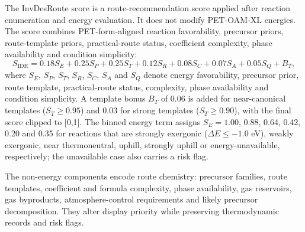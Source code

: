\documentclass[11pt, letterpaper]{article}
\newcommand{\invdesroute}{InvDesRoute}
\begin{document}
The \invdesroute{} score is a route-recommendation score applied after reaction enumeration and energy evaluation. It does not modify PET-OAM-XL energies. The score combines PET-form-aligned reaction favorability, precursor priors, route-template priors, practical-route status, coefficient complexity, phase availability and condition simplicity:
\begin{equation}
S_{\mathrm{IDR}}
=0.18S_E
+0.25S_P
+0.25S_T
+0.12S_R
+0.08S_C
+0.07S_A
+0.05S_Q
+B_T ,
\end{equation}
where $S_E$, $S_P$, $S_T$, $S_R$, $S_C$, $S_A$ and $S_Q$ denote energy favorability, precursor prior, route template, practical-route status, complexity, phase availability and condition simplicity. A template bonus $B_T$ of 0.06 is added for near-canonical templates ($S_T\geq0.95$) and 0.03 for strong templates ($S_T\geq0.90$), with the final score clipped to [0,1]. The binned energy term assigns $S_E=1.00$, 0.88, 0.64, 0.42, 0.20 and 0.35 for reactions that are strongly exergonic ($\Delta E\leq-1.0$ eV), weakly exergonic, near thermoneutral, uphill, strongly uphill or energy-unavailable, respectively; the unavailable case also carries a risk flag.

The non-energy components encode route chemistry: precursor families, route templates, coefficient and formula complexity, phase availability, gas reservoirs, gas byproducts, atmosphere-control requirements and likely precursor decomposition. They alter display priority while preserving thermodynamic records and risk flags.
\end{document}
